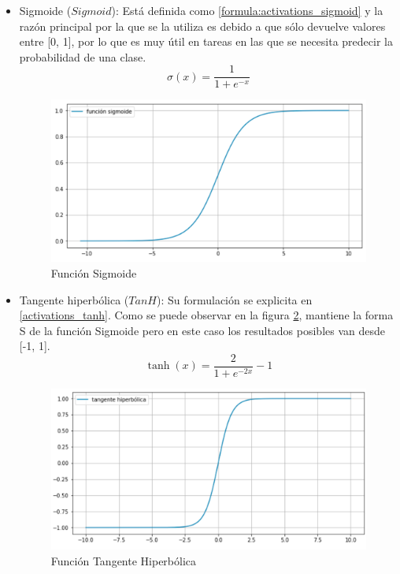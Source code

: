  \begin{itemize}
 	\item Sigmoide (\(Sigmoid\)): Está definida como \ref{formula:activations_sigmoid} y la razón principal por la que se la utiliza es debido a que sólo devuelve valores entre [0, 1], por lo que es muy útil en tareas en las que se necesita predecir la probabilidad de una clase. 
 	\begin{equation}\label{formula:activations_sigmoid}
 	\sigma(x)=\frac{1}{1+e^{-x}}
 	\end{equation}
 	\begin{figure}[!ht]
 		\centering
 		\includegraphics[width=0.7\linewidth]{images/activations_sigmoid}
 		\caption[Función Sigmoide]{Función Sigmoide}
 		\label{fig:sigmoid}
 	\end{figure}
 	
 	\item Tangente hiperbólica (\(TanH\)): Su formulación se explicita en \ref{activations_tanh}. Como se puede observar en la figura \ref{fig:activationstanh}, mantiene la forma S de la función Sigmoide pero en este caso los resultados posibles van desde [-1, 1]. 
 	\begin{equation}
\label{activations_tanh}
 	\tanh (x)=\frac{2}{1+e^{-2 x}}-1
 	\end{equation}
 	\begin{figure}[!h]
 		\centering
 		\includegraphics[width=0.7\linewidth]{images/activations_tanh}
 		\caption[Función Tangente Hiperbólica]{Función Tangente Hiperbólica}
 		\label{fig:activationstanh}
 	\end{figure}
 	 	 	

\end{itemize}

